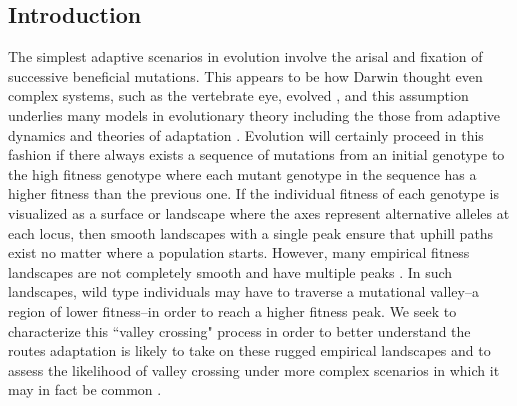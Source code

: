 \documentclass[rmp]{revtex4}
\begin{document}
\begin{spacing}{1.5}
  
\section*{Introduction}

The simplest adaptive scenarios in evolution involve the arisal and fixation of successive beneficial mutations.
This appears to be how Darwin thought even complex systems, such as the vertebrate eye, evolved \citep{darwin_1859}, and this assumption underlies many models in evolutionary theory including the those from adaptive dynamics \citep{Geritz:Kisdi:1998,Dercole:Rinaldi:2008} and theories of adaptation \citep{Gillespie:1983,Orr:1998,Gillespie:1991}.
Evolution will certainly proceed in this fashion if there always exists a sequence of mutations from an initial genotype to the high fitness genotype where each mutant genotype in the sequence has a higher fitness than the previous one.
If the individual fitness of each genotype is visualized as a surface or landscape where the axes represent alternative alleles at each locus, then smooth landscapes with a single peak ensure that uphill paths exist no matter where a population starts. However, many empirical fitness landscapes are not completely smooth and have multiple peaks \citep[reviewed in][]{Szendro:Schenk:2013,Visser:Krug:2014,Obolski:Ram:2018}.
In such landscapes, wild type individuals may have to traverse a mutational valley--a region of lower fitness--in order to reach a higher fitness peak.
We seek to characterize this ``valley crossing" process in order to better understand the routes adaptation is likely to take on these rugged empirical landscapes \citep[e.g.,][]{Aguilar-Rodriguez:Payne:2017} and to assess the likelihood of valley crossing under more complex scenarios in which it may in fact be common \citep[e.g.][]{trotter_2014}.


\end{spacing}
\end{document}

